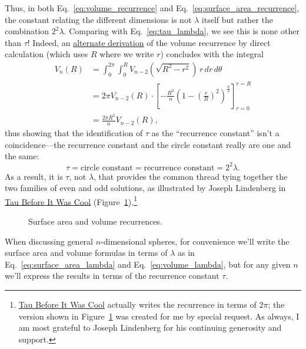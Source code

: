 Thus, in both Eq.~\eqref{eq:volume_recurrence} and Eq.~\eqref{eq:surface_area_recurrence}, the constant relating the different dimensions is not $\lambda$ itself but rather the combination $2^2\lambda$. Comparing with Eq.~\eqref{eq:tau_lambda}, we see this is none other than $\tau$! Indeed, an \href{https://en.wikipedia.org/wiki/Volume_of_an_n-ball#The_two-dimension_recursion_formula}{alternate derivation} of the volume recurrence by direct calculation (which uses $R$ where we write $r$) concludes with the integral
\begin{align}
\label{eq:integral_recurrence}
V_n(R) &= \int_0^{2\pi} \int_0^R V_{n-2}\left(\sqrt{R^2 - r^2}\right) \,r\,dr\,d\theta \nonumber \\
&= 2\pi V_{n-2}(R) \cdot \left[-\frac{R^2}{n}\left(1 - \left(\frac{r}{R}\right)^2\right)^\frac{n}{2}\right]_{r=0}^{r=R} \\
&= \frac{2\pi R^2}{n} V_{n-2}(R), \nonumber
\end{align}
thus showing that the identification of $\tau$ as the ``recurrence constant'' isn't a coincidence---the recurrence constant and the circle constant really are one and the same:
\[
\tau = \mbox{circle constant} = \mbox{recurrence constant} = 2^2\lambda.
\]
As a result, it is $\tau$, not $\lambda$, that provides the common thread tying together the two families of even and odd solutions, as illustrated by Joseph Lindenberg in \href{http://sites.google.com/site/taubeforeitwascool/}{Tau Before It Was Cool} (Figure~\ref{fig:Nspheres}).\footnote{\href{http://sites.google.com/site/taubeforeitwascool/}{Tau Before It Was Cool} actually writes the recurrence in terms of $2\pi$; the version shown in Figure~\ref{fig:Nspheres} was created for me by special request. As always, I am most grateful to Joseph Lindenberg for his continuing generosity and support.}

\begin{figure}
\begin{center}
\end{center}
\caption{Surface area and volume recurrences.\label{fig:Nspheres}}
\end{figure}

When discussing general $n$-dimensional spheres, for convenience \linebreak we'll write the surface area and volume formulas in terms of $\lambda$ as in Eq.~\eqref{eq:surface_area_lambda} and Eq.~\eqref{eq:volume_lambda}, but for any given $n$ we'll express the results in terms of the recurrence constant $\tau$.

